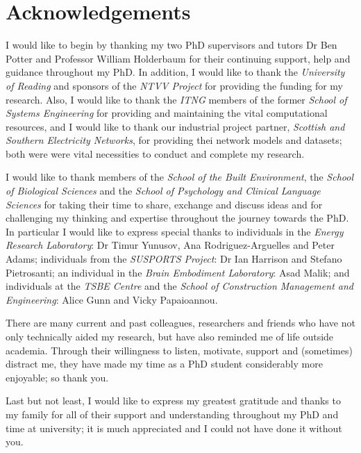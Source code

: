 \chapter*{Acknowledgements}

I would like to begin by thanking my two PhD supervisors and tutors Dr Ben Potter and Professor William Holderbaum for their continuing support, help and guidance throughout my PhD.
In addition, I would like to thank the \textit{University of Reading} and sponsors of the \textit{NTVV Project} for providing the funding for my research.
Also, I would like to thank the \textit{ITNG} members of the former \textit{School of Systems Engineering} for providing and maintaining the vital computational resources, and I would like to thank our industrial project partner, \textit{Scottish and Southern Electricity Networks}, for providing thei network models and datasets; both were were vital necessities to conduct and complete my research.

I would like to thank members of the \textit{School of the Built Environment}, the \textit{School of Biological Sciences} and the \textit{School of Psychology and Clinical Language Sciences} for taking their time to share, exchange and discuss ideas and for challenging my thinking and expertise throughout the journey towards the PhD.
In particular I would like to express special thanks to individuals in the \textit{Energy Research Laboratory}: Dr Timur Yunusov, Ana Rodriguez-Arguelles and Peter Adams; individuals from the \textit{SUSPORTS Project}: Dr Ian Harrison and Stefano Pietrosanti; an individual in the \textit{Brain Embodiment Laboratory}: Asad Malik; and individuals at the \textit{TSBE Centre} and the \textit{School of Construction Management and Engineering}: Alice Gunn and Vicky Papaioannou.

There are many current and past colleagues, researchers and friends who have not only technically aided my research, but have also reminded me of life outside academia.
Through their willingness to listen, motivate, support and (sometimes) distract me, they have made my time as a PhD student considerably more enjoyable; so thank you.


Last but not least, I would like to express my greatest gratitude and thanks to my family for all of their support and understanding throughout my PhD and time at university; it is much appreciated and I could not have done it without you.